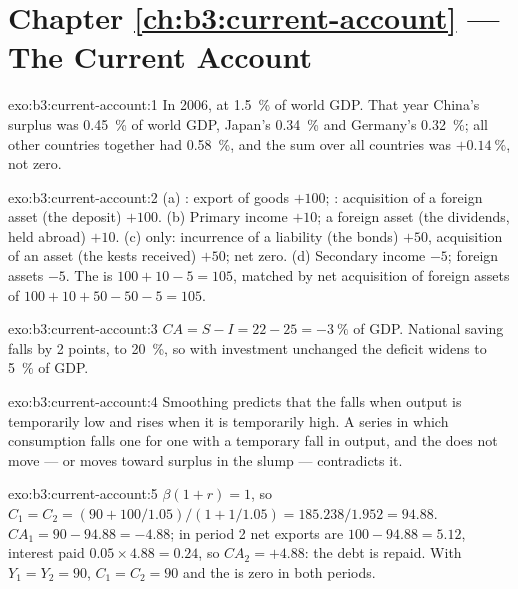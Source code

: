 \section*{Chapter \ref{ch:b3:current-account} --- The Current Account}

\begin{solution}{exo:b3:current-account:1}
In 2006, at 1.5~\% of world GDP. That year China's surplus was 0.45~\% of world GDP,
Japan's 0.34~\% and Germany's 0.32~\%; all other countries together had 0.58~\%, and the
sum over all countries was $+0.14~\%$, not zero. %
\end{solution}

\begin{solution}{exo:b3:current-account:2}
(a) : export of goods $+100$; : acquisition of a
foreign asset (the deposit) $+100$. (b) Primary income $+10$; a foreign asset (the
dividends, held abroad) $+10$. (c)  only: incurrence of a liability
(the bonds) $+50$, acquisition of an asset (the kests received) $+50$; net zero.
(d) Secondary income $-5$; foreign assets $-5$. The  is $100 + 10 - 5 =
105$, matched by net acquisition of foreign assets of $100 + 10 + 50 - 50 - 5 = 105$.
\end{solution}

\begin{solution}{exo:b3:current-account:3}
$CA = S - I = 22 - 25 = -3~\%$ of GDP. National saving falls by 2 points, to 20~\%, so
with investment unchanged the deficit widens to 5~\% of GDP.
\end{solution}

\begin{solution}{exo:b3:current-account:4}
Smoothing predicts that the  falls when output is temporarily low
and rises when it is temporarily high. A series in which consumption falls one
for one with a temporary fall in output, and the  does not move
--- or moves toward surplus in the slump --- contradicts it.
\end{solution}

\begin{solution}{exo:b3:current-account:5}
$\beta(1 + r) = 1$, so $C_1 = C_2 = (90 + 100/1.05)/(1 + 1/1.05) = 185.238/1.952 = 94.88$. $CA_1 = 90 -
94.88 = -4.88$; in period 2 net exports are $100 - 94.88 = 5.12$, interest paid $0.05 \times 4.88
= 0.24$, so $CA_2 = +4.88$: the debt is repaid. With $Y_1 = Y_2 = 90$, $C_1 = C_2 = 90$ and the
 is zero in both periods.
\end{solution}

